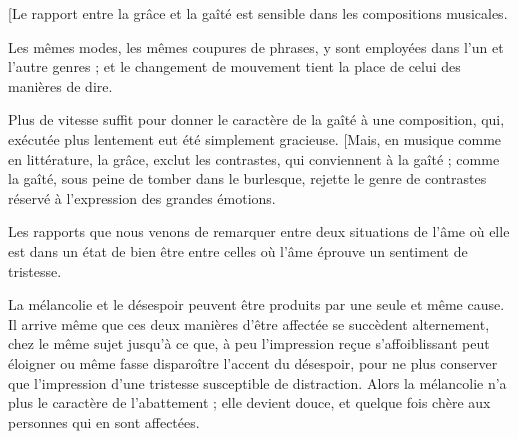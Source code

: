 \documentclass[11pt,a4paper]{article}
\begin{document}
[Le rapport entre la grâce et la gaîté  est sensible dans
les compositions musicales.

Les mêmes modes, les mêmes coupures de phrases, y 
sont employées dans l'un et l'autre genres ;  et le changement
de mouvement tient la place de celui des manières de dire.

Plus de vitesse suffit pour donner le caractère de la gaîté à une
composition, qui,  exécutée plus lentement eut
\struck{\ill{}} été simplement gracieuse. [Mais, en musique comme en
littérature,  la grâce, exclut les contrastes,
qui conviennent à la gaîté ; comme la gaîté, sous peine de tomber dans
le burlesque, rejette le  genre de contrastes réservé à l'expression des grandes
émotions.

 Les rapports que nous venons de
remarquer entre deux situations de l'âme où elle est dans un état de
bien être   entre
celles où l'âme éprouve un sentiment de tristesse.

La mélancolie et le désespoir peuvent être produits par une seule et
même cause. Il arrive même que ces deux manières d'être affectée se
succèdent alternement,  chez le même sujet
jusqu'à ce que,  à peu l'impression reçue s'affoiblissant
peut éloigner ou même fasse disparoître l'accent du désespoir, pour ne
plus conserver que l'impression  d'une tristesse
  susceptible de distraction. 
Alors la mélancolie n'a plus le caractère de l'abattement ; elle devient
douce, et quelque fois chère aux personnes qui en sont
affectées.
\end{document}
